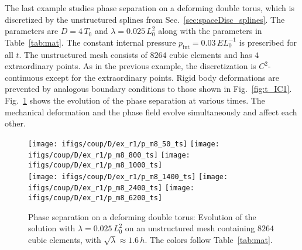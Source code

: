 \documentclass[11pt]{article}
\begin{document}
The last example studies phase separation on a deforming double torus, which is discretized by the unstructured splines from Sec.~\ref{sec:spaceDisc_splines}. 
The parameters are $D=4\,T_0$ and $\lambda=0.025\,L_0^2$ along with the parameters in Table~\ref{tab:mat}. 
The constant internal pressure $p_{\mathrm{int}}=0.03\,EL_0^{-1}$ is prescribed for all $t$. The unstructured mesh consists of $8264$ cubic elements and has $4$ extraordinary points. 
As in the previous example, the discretization is $C^2$-continuous except for the extraordinary points. 
Rigid body deformations are prevented by analogous boundary conditions to those shown in Fig.~\ref{fig:t_IC1}. 
Fig.~\ref{fig:d_evo1} shows the evolution of the phase separation at various times. 
The mechanical deformation and the phase field evolve simultaneously and affect each other. 
\begin{figure}[h]
\centering
\texttt{[image: ifigs/coup/D/ex\_r1/p\_m8\_50\_ts]}
\texttt{[image: ifigs/coup/D/ex\_r1/p\_m8\_800\_ts]}
\texttt{[image: ifigs/coup/D/ex\_r1/p\_m8\_1000\_ts]}\\
\texttt{[image: ifigs/coup/D/ex\_r1/p\_m8\_1400\_ts]}
\texttt{[image: ifigs/coup/D/ex\_r1/p\_m8\_2400\_ts]}
\texttt{[image: ifigs/coup/D/ex\_r1/p\_m8\_6200\_ts]}\\
\caption{Phase separation on a deforming double torus: Evolution of the solution with $\lambda=0.025\,L_0^2$ on an unstructured mesh containing $8264$ cubic elements, with $\sqrt{\lambda}\approx 1.6\,h$. The colors follow Table~\ref{tab:mat}.}
\label{fig:d_evo1}
\end{figure}
\end{document}
